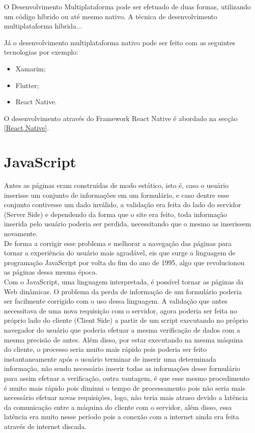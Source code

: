 O Desenvolvimento Multiplataforma pode ser efetuado de duas formas, utilizando um código híbrido ou até mesmo nativo.
A técnica de desenvolvimento multiplataforma híbrida...

Já o desenvolvimento multiplataforma nativo pode ser feito com as seguintes tecnologias por exemplo:

\begin{itemize}

\item Xamarim;
\item Flutter;
\item React Native.

\end{itemize}

O desenvolvimento através do Framework React Native é abordado na secção \ref{React Native}.

\section{JavaScript}\label{JavaScript}

Antes as páginas eram construídas de modo estático, isto é, caso o usuário inserisse um conjunto de informações em um formulário, e caso dentre esse conjunto contivesse um dado inválido, a validação era feita do lado do servidor (Server Side) e dependendo da forma que o site era feito, toda informação inserida pelo usuário poderia ser perdida, necessitando que o mesmo as inserissem novamente.\\

De forma a corrigir esse problema e melhorar a navegação das páginas para tornar a experiência do usuário mais agradável, eis que surge a linguagem de programação JavaScript por volta do fim do ano de 1995, algo que revolucionou as páginas dessa mesma época.\\

Com o JavaScript, uma linguagem interpretada, é possível tornar as páginas da Web dinâmicas. O problema da perda de informação de um formulário poderia ser facilmente corrigido com o uso dessa linguagem. A validação que antes necessitava de uma nova requisição com o servidor, agora poderia ser feita no próprio lado do cliente (Client Side) a partir de um script executando no próprio navegador do usuário que poderia efetuar a mesma verificação de dados com a mesma precisão de antes. Além disso, por estar executando na mesma máquina do cliente, o processo seria muito mais rápido pois poderia ser feito instantaneamente após o usuário terminar de inserir uma determinada informação, não sendo necessário inserir todas as informações desse formulário para assim efetuar a verificação, outra vantagem, é que esse mesmo procedimento é muito mais rápido pois diminui o tempo de processamento pois não seria mais necessário efetuar novas requisições, logo, não teria mais atraso devido a latência da comunicação entre a máquina do cliente com o servidor, além disso, essa latência era muito nesse período pois a conexão com a internet ainda era feita através de internet discada.

